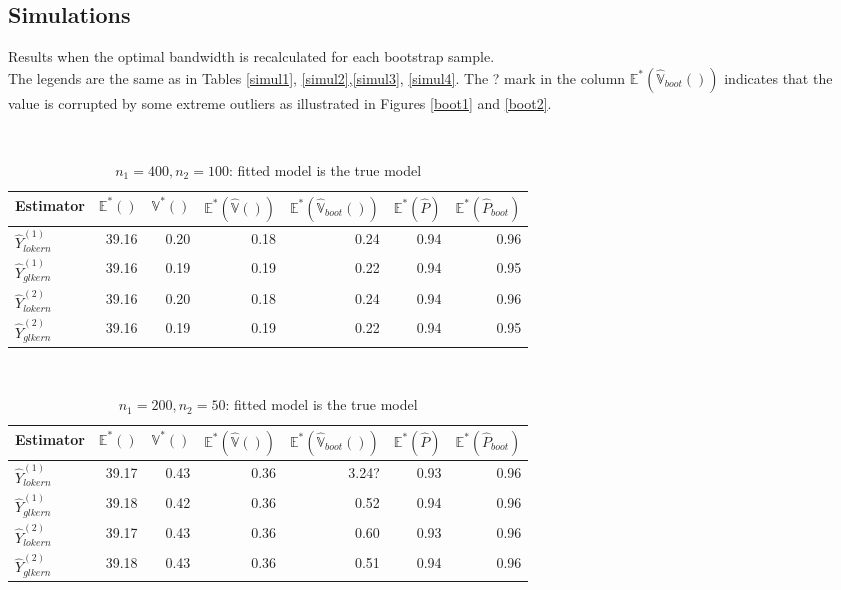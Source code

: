 \documentclass[a4paper,12pt,leqno, titlepage]{article}
\newcommand{\EX}{\mathbb{E}}
\newcommand{\VAR}{\mathbb{V}}
\begin{document}
\begin{appendix}
{{{ \subsection{Simulations}\label{appendixtablessimul}
 \normalsize
 Results when the optimal bandwidth is recalculated for each bootstrap sample.\\
 The legends are the same as in Tables \ref{simul1}, \ref{simul2},\ref{simul3}, \ref{simul4}. The ? mark  in the column $\EX^*(\hat{\VAR}_{boot}())$ indicates that the value is corrupted by some extreme outliers as illustrated in Figures \ref{boot1} and \ref{boot2}.
\small
\begin{table}[h]
\centering
\caption{$n_1=400,n_2=100$: fitted model is the true model }\label{appsimul1}\\[0.5cm]
\begin{tabular}{lrrrrrr}
  \hline
Estimator & $\EX^*()$ & $\VAR^*()$ & $\EX^*(\hat{\VAR}())$ & $\EX^*(\hat{\VAR}_{boot}())$ & $\EX^*(\hat{P})$ & $\EX^*(\hat{P}_{boot})$ \\ \hline
$\hat{Y}^{(1)}_{lokern}$    & 39.16 & 0.20 & 0.18 &0.24  &0.94  & 0.96  \\
$\hat{Y}^{(1)}_{glkern}$    & 39.16 & 0.19 & 0.19 &0.22  &0.94  & 0.95  \\
$\hat{Y}^{(2)}_{lokern}$    & 39.16 & 0.20 & 0.18 &0.24  &0.94  & 0.96   \\
$\hat{Y}^{(2)}_{glkern}$    & 39.16 & 0.19 & 0.19 &0.22  &0.94  & 0.95  \\ \hline
\end{tabular}
\end{table}
\begin{table}[h]
\centering
\caption{$n_1=200,n_2=50$: fitted model is the true model }\label{appsimul2}\\[0.5cm]
\begin{tabular}{lrrrrrr}
  \hline
Estimator  & $\EX^*()$ & $\VAR^*()$ & $\EX^*(\hat{\VAR}())$ & $\EX^*(\hat{\VAR}_{boot}())$
& $\EX^*(\hat{P})$ &  $\EX^*(\hat{P}_{boot})$\\ \hline
$\hat{Y}^{(1)}_{lokern}$    & 39.17 & 0.43 & 0.36 & 3.24?      &0.93 & 0.96 \\
$\hat{Y}^{(1)}_{glkern}$    & 39.18 & 0.42 & 0.36 & 0.52       &0.94 & 0.96\\
$\hat{Y}^{(2)}_{lokern}$    & 39.17 & 0.43 & 0.36 & 0.60       &0.93 & 0.96 \\
$\hat{Y}^{(2)}_{glkern}$    & 39.18 & 0.43 & 0.36 & 0.51       &0.94 & 0.96 \\ \hline


\end{tabular}
\end{table}}}}
\end{appendix}
\end{document}
